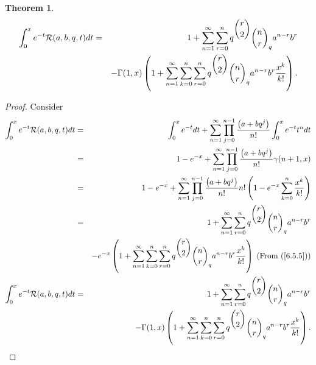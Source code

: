 \documentclass[12pt]{article}
\newtheorem{The}{Theorem}[section]
\numberwithin{equation}{section}
\begin{document}
\begin{The}
\begin{eqnarray}
\int_{0}^xe^{-t}\mathcal{R}(a,b,q,t)dt &=& 1+ \sum_{n=1}^\infty  \sum_{r=0}^n q^{\dbinom{r}{2}} \dbinom{n}{r}_q a^{n-r} b^r \nonumber\\
&& -\Gamma (1, x)\left(1 + \sum_{n=1}^\infty \sum_{k=0}^n \sum_{r=0}^n q^{\dbinom{r}{2}} \dbinom{n}{r}_q a^{n-r} b^r  \frac{x^k}{k!}\right).
\end{eqnarray}
\end{The}
\begin{proof} Consider
\begin{eqnarray*}
\int_{0}^xe^{-t}\mathcal{R}(a,b,q,t)dt &=& \int_{0}^xe^{-t} dt + \sum_{n=1}^\infty  \prod_{j=0}^{n-1}\frac {\left(a+bq^j\right)}{n!} \int_{0}^xe^{-t}t^n dt\\
&=& 1- e^{-x} + \sum_{n=1}^\infty \prod_{j=0}^{n-1}\frac {\left(a+bq^j\right)}{n!} \gamma(n+1,x)\\
&=& 1- e^{-x} + \sum_{n=1}^\infty  \prod_{j=0}^{n-1}\frac {\left(a+bq^j\right)}{n!} n!\left( 1-e^{-x}\sum_{k=0}^n \frac{x^k}{k!}\right)\\
&=& 1 + \sum_{n=1}^\infty \sum_{r=0}^n q^{\dbinom{r}{2}} \dbinom{n}{r}_q a^{n-r} b^r \nonumber\\
&& - e^{-x}\left(1 + \sum_{n=1}^\infty  \sum_{k=0}^n \sum_{r=0}^n q^{\dbinom{r}{2}} \dbinom{n}{r}_q a^{n-r} b^r\frac{x^k}{k!}\right)\;(\textrm{From (\ref{6.5.5})})\\
\int_{0}^xe^{-t}\mathcal{R}(a,b,q,t)dt &=& 1+ \sum_{n=1}^\infty  \sum_{r=0}^n q^{\dbinom{r}{2}} \dbinom{n}{r}_q a^{n-r} b^r  \nonumber\\
&& -\Gamma (1, x)\left(1 + \sum_{n=1}^\infty \sum_{k=0}^n \sum_{r=0}^n q^{\dbinom{r}{2}} \dbinom{n}{r}_q a^{n-r} b^r  \frac{x^k}{k!}\right).
\end{eqnarray*}
\end{proof}
\end{document}
